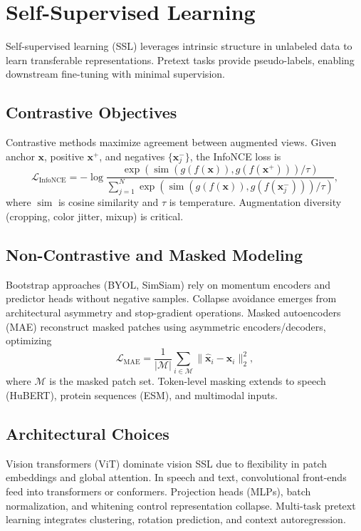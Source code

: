 \documentclass{article}
\begin{document}
\section{Self-Supervised Learning}
Self-supervised learning (SSL) leverages intrinsic structure in unlabeled data to learn transferable representations. Pretext tasks provide pseudo-labels, enabling downstream fine-tuning with minimal supervision.

\subsection{Contrastive Objectives}
Contrastive methods maximize agreement between augmented views. Given anchor $\mathbf{x}$, positive $\mathbf{x}^+$, and negatives $\{\mathbf{x}_j^-\}$, the InfoNCE loss is
\begin{equation}
  \mathcal{L}_{\mathrm{InfoNCE}} = -\log \frac{\exp(\operatorname{sim}(g(f(\mathbf{x})), g(f(\mathbf{x}^+)))/\tau)}{\sum_{j=1}^{N} \exp(\operatorname{sim}(g(f(\mathbf{x})), g(f(\mathbf{x}_j^-)))/\tau)},
\end{equation}
where $\operatorname{sim}$ is cosine similarity and $\tau$ is temperature. Augmentation diversity (cropping, color jitter, mixup) is critical.

\subsection{Non-Contrastive and Masked Modeling}
Bootstrap approaches (BYOL, SimSiam) rely on momentum encoders and predictor heads without negative samples. Collapse avoidance emerges from architectural asymmetry and stop-gradient operations. Masked autoencoders (MAE) reconstruct masked patches using asymmetric encoders/decoders, optimizing
\begin{equation}
  \mathcal{L}_{\mathrm{MAE}} = \frac{1}{|\mathcal{M}|} \sum_{i \in \mathcal{M}} \| \hat{\mathbf{x}}_i - \mathbf{x}_i \|_2^2,
\end{equation}
where $\mathcal{M}$ is the masked patch set. Token-level masking extends to speech (HuBERT), protein sequences (ESM), and multimodal inputs.

\subsection{Architectural Choices}
Vision transformers (ViT) dominate vision SSL due to flexibility in patch embeddings and global attention. In speech and text, convolutional front-ends feed into transformers or conformers. Projection heads (MLPs), batch normalization, and whitening control representation collapse. Multi-task pretext learning integrates clustering, rotation prediction, and context autoregression.
\end{document}
